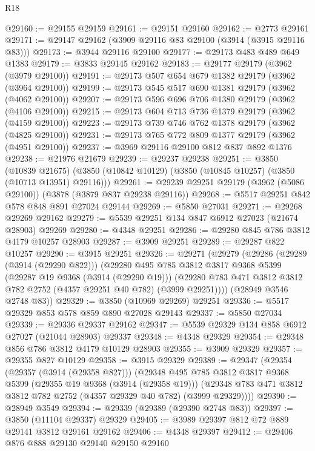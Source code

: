 \begin{lexlean}{R18}
\begin{coremodule}
@29160 := @29155 @29159
@29161 := @29151 @29160
@29162 := @2773 @29161
@29171 := @29147 @29162 (@3909 @29116 @83 @29100 (@3914 (@3915 @29116 @83)))
@29173 := @3944 @29116 @29100
@29177 := @29173 @483 @489 @649 @1383
@29179 := @3833 @29145 @29162
@29183 := @29177 @29179 (@3962 (@3979 @29100))
@29191 := @29173 @507 @654 @679 @1382 @29179 (@3962 (@3964 @29100))
@29199 := @29173 @545 @517 @690 @1381 @29179 (@3962 (@4062 @29100))
@29207 := @29173 @596 @696 @706 @1380 @29179 (@3962 (@4106 @29100))
@29215 := @29173 @604 @713 @736 @1379 @29179 (@3962 (@4159 @29100))
@29223 := @29173 @739 @746 @762 @1378 @29179 (@3962 (@4825 @29100))
@29231 := @29173 @765 @772 @809 @1377 @29179 (@3962 (@4951 @29100))
@29237 := @3969 @29116 @29100 @812 @837 @892 @1376
@29238 := @21976 @21679
@29239 := @29237 @29238
@29251 := @3850
    (@10839 @21675)
    (@3850 (@10842 @10129) (@3850 (@10845 @10257) (@3850 (@10713 @13951) @29116)))
@29261 := @29239 @29251 @29179 (@3962 (@5086 @29100)) (@3878 (@3879 @837 @29238 @29116))
@29268 := @5517 @29251 @842 @578 @848 @891 @27024 @29144
@29269 := @5850 @27031
@29271 := @29268 @29269 @29162
@29279 := @5539 @29251 @134 @847 @6912 @27023 (@21674 @28903) @29269
@29280 := @4348 @29251
@29286 := @29280 @845 @786 @3812 @4179 @10257 @28903
@29287 := @3909 @29251
@29289 := @29287 @822 @10257
@29290 := @3915 @29251
@29326 := @29271
    (@29279
      (@29286
        (@29289 (@3914 (@29290 @822)))
        (@29280
          @495
          @785
          @3812
          @3817
          @9368
          @5399
          (@29287 @19 @9368 (@3914 (@29290 @19)))
          (@29280 @783 @471 @3812 @3812 @782 @2752 (@4357 @29251 @40 @782) (@3999 @29251))))
      (@28949 @3546 @2748 @83))
@29329 := @3850 (@10969 @29269) @29251
@29336 := @5517 @29329 @853 @578 @859 @890 @27028 @29143
@29337 := @5850 @27034
@29339 := @29336 @29337 @29162
@29347 := @5539 @29329 @134 @858 @6912 @27027 (@21044 @28903) @29337
@29348 := @4348 @29329
@29354 := @29348 @856 @786 @3812 @4179 @10129 @28903
@29355 := @3909 @29329
@29357 := @29355 @827 @10129
@29358 := @3915 @29329
@29389 := @29347
    (@29354
      (@29357 (@3914 (@29358 @827)))
      (@29348
        @495
        @785
        @3812
        @3817
        @9368
        @5399
        (@29355 @19 @9368 (@3914 (@29358 @19)))
        (@29348 @783 @471 @3812 @3812 @782 @2752 (@4357 @29329 @40 @782) (@3999 @29329))))
@29390 := @28949 @3549
@29394 := @29339 (@29389 (@29390 @2748 @83))
@29397 := @3850 (@11104 @29337) @29329
@29405 := @3989 @29397 @812 @72 @889 @29141 @3812 @29161 @29162
@29406 := @4348 @29397
@29412 := @29406 @876 @888 @29130 @29140 @29150 @29160

\end{coremodule}
\end{lexlean}
